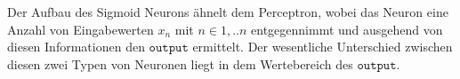 \noindent
Der Aufbau des Sigmoid Neurons ähnelt dem Perceptron, wobei das Neuron eine Anzahl von Eingabewerten $x_n$ mit $n \in {1, .. n}$ entgegennimmt und ausgehend von diesen Informationen den $\mathtt{output}$ ermittelt. Der wesentliche Unterschied zwischen diesen zwei Typen von Neuronen liegt in dem Wertebereich des $\mathtt{output}$.